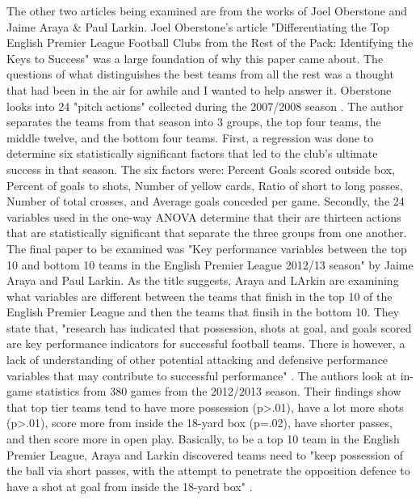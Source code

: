 \documentclass[12pt,english]{article}
\begin{document}
\begin{Literature Review}
\begin{doublespace}
\indent The other two articles being examined are from the works of Joel Oberstone and Jaime Araya & Paul Larkin. Joel Oberstone's article "Differentiating the Top English Premier League Football Clubs from the Rest of the Pack: Identifying the Keys to Success" was a large foundation of why this paper came about. The questions of what distinguishes the best teams from all the rest was a thought that had been in the air for awhile and I wanted to help answer it. Oberstone looks into 24 "pitch actions" collected during the 2007/2008 season \citep{oberstone}. The author separates the teams from that season into 3 groups, the top four teams, the middle twelve, and the bottom four teams. First, a regression was done to determine six statistically significant factors that led to the club's ultimate success in that season. The six factors were: Percent Goals scored outside box, Percent of goals to shots, Number of yellow cards, Ratio of short to long passes, Number of total crosses, and Average goals conceded per game. Secondly, the 24 variables used in the one-way ANOVA determine that their are thirteen actions that are statistically significant that separate the three groups from one another.\\
\indent The final paper to be examined was "Key performance variables between the top 10 and bottom 10 teams in the English Premier League 2012/13 season" by Jaime Araya and Paul Larkin. As the title suggests, Araya and LArkin are examining what variables are different between the teams that finish in the top 10 of the English Premier League and then the teams that finsih in the bottom 10. They state that, "research has indicated that possession, shots at goal, and goals scored are key performance indicators for successful football teams. There is however, a lack of understanding of other potential attacking and defensive performance variables that may contribute to successful performance" \citep{araya}. The authors look at in-game statistics from 380 games from the 2012/2013 season. Their findings show that top tier teams tend to have more possession (p>.01), have a lot more shots (p>.01), score more from inside the 18-yard box (p=.02), have shorter passes, and then score more in open play. Basically, to be a top 10 team in the English Premier League, Araya and Larkin discovered teams need to "keep possession of the ball via short passes, with the attempt to penetrate the opposition defence to have a shot at goal from inside the 18-yard box" \citep{araya}.

\end{doublespace}
\end{Literature Review}
\end{document}
